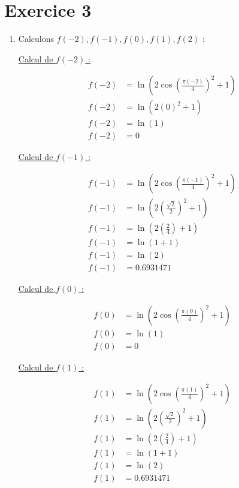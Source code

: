 \documentclass[12pt, letterpaper]{article}
\begin{document}
\section*{Exercice 3}

\begin{enumerate}
\item Calculons $f(-2), f(-1), f(0), f(1), f(2)$ :

  \underline{Calcul de $f(-2)$ :}
  
  \begin{equation*}
    \begin{split}
      f(-2) & = \ln(2\cos \left( \frac{\pi(-2)}{4} \right)^2 + 1) \\
      f(-2) & = \ln(2(0)^2 + 1) \\
      f(-2) & = \ln(1) \\
      f(-2) & = 0
    \end{split}
  \end{equation*}

  \underline{Calcul de $f(-1)$ :}
  
  \begin{equation*}
    \begin{split}
      f(-1) & = \ln(2\cos \left( \frac{\pi(-1)}{4} \right)^2 + 1) \\
      f(-1) & = \ln(2 \left( \frac{\sqrt{2}}{2} \right)^2 + 1) \\
      f(-1) & = \ln(2 \left( \frac{2}{4} \right) + 1) \\
      f(-1) & = \ln(1 + 1) \\
      f(-1) & = \ln(2) \\
      f(-1) & = 0.6931471
    \end{split}
  \end{equation*}

  \underline{Calcul de $f(0)$ :}
  
  \begin{equation*}
    \begin{split}
      f(0) & = \ln(2\cos \left( \frac{\pi(0)}{4} \right)^2 + 1) \\
      f(0) & = \ln(1) \\
      f(0) & = 0
    \end{split}
  \end{equation*}

  \underline{Calcul de $f(1)$ :}
  
  \begin{equation*}
    \begin{split}
      f(1) & = \ln(2\cos \left( \frac{\pi(1)}{4} \right)^2 + 1) \\
      f(1) & = \ln(2 \left( \frac{\sqrt{2}}{2} \right)^2 + 1) \\
      f(1) & = \ln(2 \left( \frac{2}{4} \right) + 1) \\
      f(1) & = \ln(1 + 1) \\
      f(1) & = \ln(2) \\
      f(1) & = 0.6931471
    \end{split}
  \end{equation*}


\end{enumerate}
\end{document}
